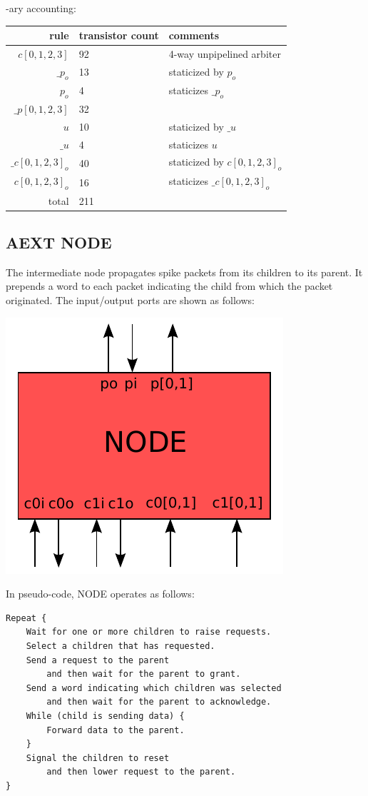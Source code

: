 \documentclass{article}
\begin{document}
-ary accounting:

\begin{center}
    \begin{tabular}{|r|l|l|}
    \hline
    rule & transistor count & comments \\ \hline
    $c[0,1,2,3]$ & 92 & 4-way unpipelined arbiter \\ \hline
    $\_p_o$ & 13 & staticized by $p_o$ \\ \hline
    $p_o$ & 4 & staticizes $\_p_o$ \\ \hline
    $\_p[0,1,2,3]$ & 32 & \\ \hline
    $u$ & 10 & staticized by $\_u$ \\ \hline
    $\_u$ & 4 & staticizes $u$ \\ \hline
    $\_c[0,1,2,3]_o$ & 40 & staticized by $c[0,1,2,3]_o$ \\ \hline
    $c[0,1,2,3]_o$ & 16 & staticizes $\_c[0,1,2,3]_o$ \\ \hline
    \hline total & 211 & \\ \hline
    \end{tabular}
\end{center}

\subsection{AEXT NODE \label{sec:AEXT_NODE}}

The intermediate node propagates spike packets from its children to its parent.
It prepends a word to each packet indicating the child from which the packet
originated. The input/output ports are shown as follows:

\begin{center}
  \includegraphics[width=.25\textwidth]{img/aext_node.pdf}
\end{center}

\noindent
In pseudo-code, NODE operates as follows:

\begin{lstlisting}
Repeat {
    Wait for one or more children to raise requests.
    Select a children that has requested.
    Send a request to the parent
        and then wait for the parent to grant.
    Send a word indicating which children was selected
        and then wait for the parent to acknowledge.
    While (child is sending data) {
        Forward data to the parent.
    }
    Signal the children to reset
        and then lower request to the parent.
}
\end{lstlisting}
\end{document}
